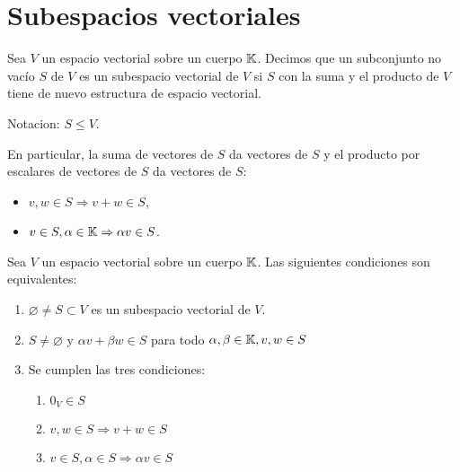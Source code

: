 \section{Subespacios vectoriales}
\begin{definition}
	Sea \(V \) un espacio vectorial sobre un cuerpo \(\mathbb{K} \). Decimos que un subconjunto no vacío \(S \) de \(V \) es un subespacio vectorial de \(V \) si \(S \) con la suma y el producto de \(V \) tiene de nuevo estructura de espacio vectorial.

	Notacion: \(S \leq V \).

	En particular, la suma de vectores de \(S \) da vectores de \(S \) y el producto por escalares de vectores de \(S \) da vectores de \(S \):
	\begin{itemize}
		\item \(v,w \in S \Rightarrow v + w \in S \),
		\item \(v \in S, \alpha \in \mathbb{K} \Rightarrow \alpha v \in S \).
	\end{itemize}
\end{definition}
\begin{proposition}
	Sea \(V \) un espacio vectorial sobre un cuerpo \(\mathbb{K} \). Las siguientes condiciones son equivalentes:
	\begin{enumerate}
		\item \(\varnothing \neq S \subset V \) es un subespacio vectorial de \(V \).
		\item \(S \neq \varnothing \) y \(\alpha v + \beta w \in S \) para todo \(\alpha, \beta \in \mathbb{K}, v,w \in S \)
		\item Se cumplen las tres condiciones:
		      \begin{enumerate}
			      \item \(0_V \in S \)
			      \item \(v, w \in S \Rightarrow v + w \in S \)
			      \item \(v \in S, \alpha \in S \Rightarrow \alpha v \in S \)
		      \end{enumerate}
	\end{enumerate}
\end{proposition}
